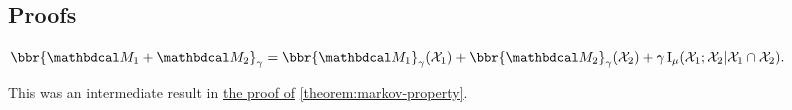 \begin{subappendices}
    
    \section{Proofs}

    \begin{lemma}
            \label{lem:sum-info-formula}
        $\bbr{\dg M_1 + \dg M_2}_\gamma =
            \bbr{\dg M_1}_\gamma(\X_1) + \bbr{\dg M_2}_\gamma(\X_2) 
                + \gamma \I_\mu(\X_1; \X_2| \X_1 \cap \X_2).$
    \end{lemma}
    This was an intermediate result in \hyperref[proof:theorem:markov-property]{the proof of} \cref{theorem:markov-property}.



\end{subappendices}
